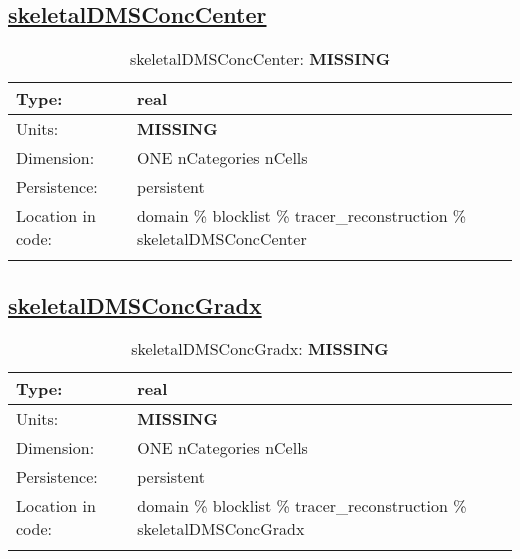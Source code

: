 \subsection[skeletalDMSConcCenter]{\hyperref[sec:var_tab_tracer_reconstruction]{skeletalDMSConcCenter}}
\label{subsec:var_sec_tracer_reconstruction_skeletalDMSConcCenter}
\begin{center}
\begin{longtable}{| p{2.0in} | p{4.0in} |}
        \hline 
        Type: & real \\
        \hline 
        Units: & {\bf \color{red} MISSING} \\
        \hline 
        Dimension: & ONE nCategories nCells \\
        \hline 
        Persistence: & persistent \\
        \hline 
         Location in code: & domain \% blocklist \% tracer\_reconstruction \% skeletalDMSConcCenter \\
         \hline 
    \caption{skeletalDMSConcCenter: {\bf \color{red} MISSING}}
\end{longtable}
\end{center}
\subsection[skeletalDMSConcGradx]{\hyperref[sec:var_tab_tracer_reconstruction]{skeletalDMSConcGradx}}
\label{subsec:var_sec_tracer_reconstruction_skeletalDMSConcGradx}
\begin{center}
\begin{longtable}{| p{2.0in} | p{4.0in} |}
        \hline 
        Type: & real \\
        \hline 
        Units: & {\bf \color{red} MISSING} \\
        \hline 
        Dimension: & ONE nCategories nCells \\
        \hline 
        Persistence: & persistent \\
        \hline 
         Location in code: & domain \% blocklist \% tracer\_reconstruction \% skeletalDMSConcGradx \\
         \hline 
    \caption{skeletalDMSConcGradx: {\bf \color{red} MISSING}}
\end{longtable}
\end{center}

